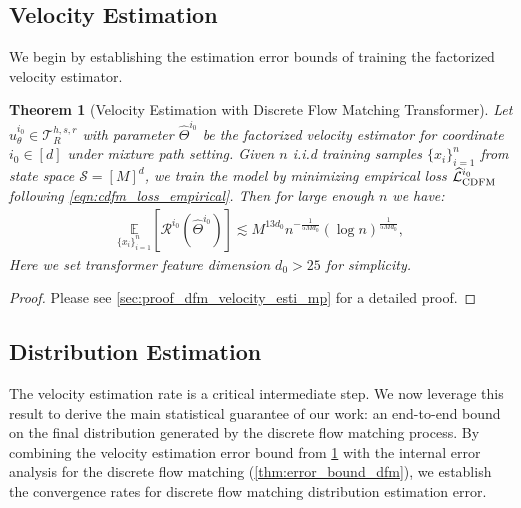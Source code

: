 \documentclass[12pt]{article}
\numberwithin{equation}{section}
\let\hat\widehat
\newcommand{\wh}{\widehat}
\renewcommand{\hat}{\wh}
\DeclareMathOperator*{\E}{{\mathbb{E}}}
\def\E{\mathbb{E}}
\theoremstyle{theoremstyle}
\newtheorem{theorem}{Theorem}[section]
\numberwithin{equation}{section}
\numberwithin{theorem}{section}
\numberwithin{proposition}{section}
\numberwithin{definition}{section}
\numberwithin{lemma}{section}
\numberwithin{assumption}{section}
\numberwithin{remark}{section}
\begin{document}
\vspace{-1mm}
\subsection{Velocity Estimation}
\label{sec:velocity_estimation_extension}
\vspace{-1mm}

We begin by establishing the estimation error bounds of training the factorized velocity estimator.  


\begin{theorem}[Velocity Estimation with Discrete Flow Matching Transformer]
\label{thm:velocity_estimation_extension_mixture_path}
Let $\hat{u}^{i_0}_\theta\in\mathcal{T}^{h,s,r}_R$ with parameter $\hat{\Theta}^{i_0}$ be the factorized velocity estimator for coordinate $i_0 \in [d]$ under mixture path setting.
Given $n$ i.i.d training samples $\{x_i\}_{i=1}^n$ from state space $\mathcal{S} = [M]^d$, we train the model by minimizing empirical  loss $\hat{\mathcal{L}}^{i_0}_{\rm CDFM}$ following \eqref{eqn:cdfm_loss_empirical}.
Then for large enough $n$ we have: 
\begin{align*}
    \underset{\{x_i\}_{i=1}^n}{\E}[\mathcal{R}^{i_0}(\hat{\Theta}^{i_0})] \lesssim M^{13d_0}n^{-\frac{1}{5Md_0}}(\log n)^{\frac{1}{5Md_0}},
\end{align*}
Here we set transformer feature dimension $d_0>25$ for simplicity.
\end{theorem}

\begin{proof}
    Please see \cref{sec:proof_dfm_velocity_esti_mp} for a detailed proof.
\end{proof}




\subsection{Distribution Estimation}
\label{sec:distribution_estimation_extension}



The velocity estimation rate is a critical intermediate step. 
We now leverage this result to derive the main statistical guarantee of our work: an end-to-end bound on the final distribution generated by the discrete flow matching process. 
By combining the velocity estimation error bound from  \cref{thm:velocity_estimation_extension_mixture_path} with the internal error analysis for the discrete flow matching (\cref{thm:error_bound_dfm}), we establish the convergence rates for discrete flow matching distribution estimation error.
\end{document}
